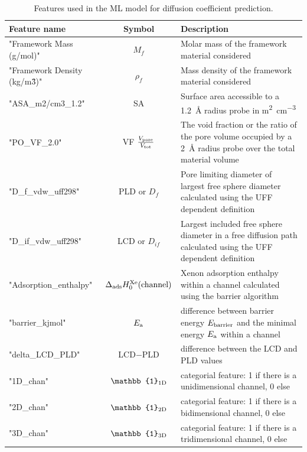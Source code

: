 \documentclass[main]{subfiles}
\begin{document}
\begin{table}[ht]
  \setlength{\extrarowheight}{1pt}
  \centering
  \begin{tabular}{|l|c|m{8cm}|}
  \hline
    Feature name  &  Symbol   &   Description\\
  \hline
      "Framework Mass (g/mol)" &   $M_f$ &   Molar mass of the framework material considered  \\
      "Framework Density (kg/m\^3)" &   $\rho_f$ &   Mass density of the framework material considered  \\
      "ASA\_m2/cm3\_1.2" &   SA &   Surface area accessible to a \SI{1.2}{\angstrom} radius probe in \si{\square\m\per\cubic\cm}  \\
      "PO\_VF\_2.0" &  VF $\tfrac{V_{\text{pore}}}{V_{\text{tot}}}$ &  The void fraction or the ratio of the pore volume occupied by a \SI{2}{\angstrom} radius probe over the total material volume  \\
      "D\_f\_vdw\_uff298" &   PLD or $D_f$  &   Pore limiting diameter of largest free sphere diameter calculated using the UFF dependent definition  \\
      "D\_if\_vdw\_uff298" &   LCD or $D_{if}$ &   Largest included free sphere diameter in a free diffusion path calculated using the UFF dependent definition  \\
      "Adsorption\_enthalpy" &   $\Delta_{\text{ads}}H_0^{\text{Xe}}(\text{channel})$  &   Xenon adsorption enthalpy within a channel calculated using the barrier algorithm  \\
      "barrier\_kjmol" &   $E_{\text{a}}$  &   difference between barrier energy $E_{\text{barrier}}$ and the minimal energy $E_{\text{a}}$ within a channel \\
      "delta\_LCD\_PLD" &   LCD$-$PLD  &   difference between the LCD and PLD values \\
      "1D\_chan" &  $\mathbb{1}\e{1D}$   &   categorial feature: 1 if there is a unidimensional channel, 0 else \\
      "2D\_chan" &  $\mathbb{1}\e{2D}$   &   categorial feature: 1 if there is a bidimensional channel, 0 else \\
      "3D\_chan" &  $\mathbb{1}\e{3D}$   &   categorial feature: 1 if there is a tridimensional channel, 0 else \\
    \hline
  \end{tabular}
  \caption{ Features used in the ML model for diffusion coefficient prediction. }\label{Table:feat_diff}
\end{table}
\end{document}
